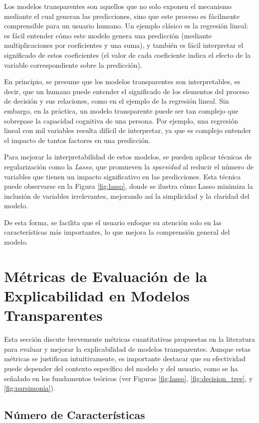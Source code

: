 Los modelos transparentes son aquellos que no solo exponen el mecanismo mediante el cual generan las predicciones, sino que este proceso es fácilmente comprensible para un usuario humano. Un ejemplo clásico es la regresión lineal: es fácil entender cómo este modelo genera una predicción (mediante multiplicaciones por coeficientes y una suma), y también es fácil interpretar el significado de estos coeficientes (el valor de cada coeficiente indica el efecto de la variable correspondiente sobre la predicción).

En principio, se presume que los modelos transparentes son interpretables, es decir, que un humano puede entender el significado de los elementos del proceso de decisión y sus relaciones, como en el ejemplo de la regresión lineal. Sin embargo, en la práctica, un modelo transparente puede ser tan complejo que sobrepase la capacidad cognitiva de una persona. Por ejemplo, una regresión lineal con mil variables resulta difícil de interpretar, ya que es complejo entender el impacto de tantos factores en una predicción.

Para mejorar la interpretabilidad de estos modelos, se pueden aplicar técnicas de regularización como la \textit{Lasso}, que promueven la \textit{sparsidad} al reducir el número de variables que tienen un impacto significativo en las predicciones. Esta técnica puede observarse en la Figura \ref{fig:lasso}, donde se ilustra cómo Lasso minimiza la inclusión de variables irrelevantes, mejorando así la simplicidad y la claridad del modelo.

De esta forma, se facilita que el usuario enfoque su atención solo en las características más importantes, lo que mejora la comprensión general del modelo.

\section{Métricas de Evaluación de la Explicabilidad en Modelos Transparentes}

Esta sección discute brevemente métricas cuantitativas propuestas en la literatura para evaluar y mejorar la explicabilidad de modelos transparentes. Aunque estas métricas se justifican intuitivamente, es importante destacar que su efectividad puede depender del contexto específico del modelo y del usuario, como se ha señalado en los fundamentos teóricos (ver Figuras \ref{fig:lasso}, \ref{fig:decision_tree}, y \ref{fig:parsimonia}).

\subsection{Número de Características}

